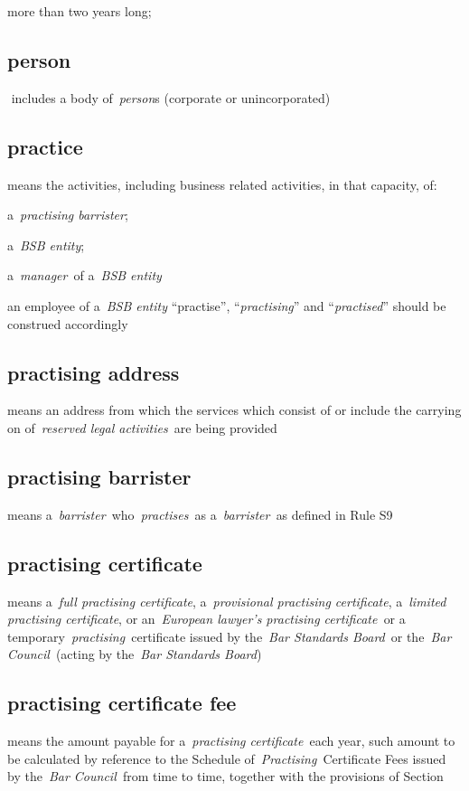   more than two years long;  \subsection{person } includes a body of~\emph{person}s (corporate or
  unincorporated)  \subsection{practice } means the activities, including business related
  activities, in that capacity, of: \al \item a~\emph{practising barrister};  \item a~\emph{BSB entity};  \item a~\emph{manager~}of a~\emph{BSB entity}  \item an
  employee of a~\emph{BSB entity} ``practise'', ``\emph{practising}''
  and ``\emph{practised}'' should be construed accordingly  \la  \subsection{practising address } means an address from which the services
  which consist of or include the carrying on of~\emph{reserved legal
  activities~}are being provided  \subsection{practising barrister } means
  a~\emph{barrister~}who~\emph{practises~}as a~\emph{barrister~}as
  defined in Rule S9  \subsection{practising certificate } means a~\emph{full practising
  certificate}, a~\emph{provisional practising certificate},
  a~\emph{limited practising certificate}, or an~\emph{European lawyer's
  practising certificate~}or a temporary~\emph{practising~}certificate
  issued by the~\emph{Bar Standards Board}~or the~\emph{Bar
  Council}~(acting by the~\emph{Bar Standards Board})  \subsection{practising certificate fee } means the amount payable for
  a~\emph{practising certificate~}each year, such amount to be
  calculated by reference to the Schedule
  of~\emph{Practising}~Certificate Fees issued by the~\emph{Bar
  Council~}from time to time, together with the provisions of Section
